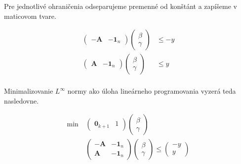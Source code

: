 \documentclass[12pt,oneside,a4paper,slovak]{article}
\begin{document}
Pre jednotlivé ohraničenia odseparujeme premenné od konštánt a zapíšeme v maticovom tvare.

\begin{align*}
	\left(
		\begin{array}{c|c}
			-\mathbf{A} & -\mathbf{1}_n
		\end{array}
	\right)
	\left(
		\begin{array}{c}
			\beta \\
			\hline
			\gamma
		\end{array}
	\right) &\leq -y \\
	\left(
		\begin{array}{c|c}
			\mathbf{A} & -\mathbf{1}_n
		\end{array}
	\right)
	\left(
		\begin{array}{c}
			\beta \\
			\hline
			\gamma
		\end{array}
	\right) &\leq y \\
\end{align*}

Minimalizovanie $L^{\infty}$ normy ako úloha lineárneho programovania vyzerá teda nasledovne.


\begin{align*}
	\text{min}~ &
	\left(
		\begin{array}{c|c}
			\mathbf{0}_{k+1} & 1
		\end{array}
	\right)
	\left(
		\begin{array}{c}
			\beta \\
			\hline
			\gamma
		\end{array}
	\right) \\
	&\left(
		\begin{array}{c|c}
			-\mathbf{A} & -\mathbf{1}_n \\
			\hline
			\mathbf{A} & -\mathbf{1}_n
		\end{array}
	\right)
	\left(
		\begin{array}{c}
			\beta \\
			\hline
			\gamma
		\end{array}
	\right)
	\leq
	\left(
		\begin{array}{c}
			-y \\
			\hline
			y
		\end{array}
	\right)
\end{align*}
\end{document}

